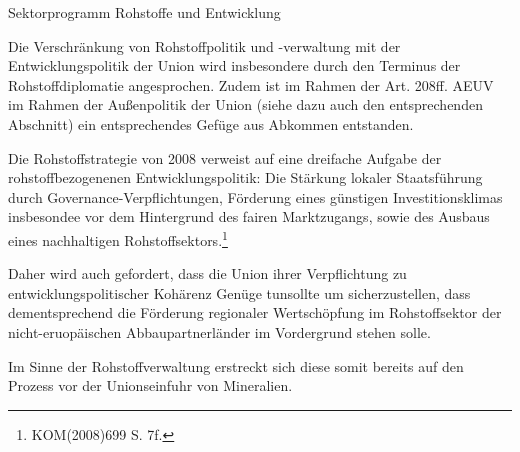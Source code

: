 \documentclass[12pt,a4paper,oneside]{book} %
\begin{document}
{	Sektorprogramm Rohstoffe und Entwicklung
	
	Die Verschränkung von Rohstoffpolitik und -verwaltung mit der Entwicklungspolitik der Union wird insbesondere durch den Terminus der Rohstoffdiplomatie angesprochen. Zudem ist im Rahmen der Art. 208ff. AEUV im Rahmen der Außenpolitik der Union (siehe dazu auch den entsprechenden Abschnitt) ein entsprechendes Gefüge aus Abkommen entstanden.
	
	Die Rohstoffstrategie von 2008 verweist auf eine dreifache Aufgabe der rohstoffbezogenenen Entwicklungspolitik: Die Stärkung lokaler Staatsführung durch Governance-Verpflichtungen, Förderung eines günstigen Investitionsklimas insbesondee vor dem Hintergrund des fairen Marktzugangs, sowie des Ausbaus eines nachhaltigen Rohstoffsektors.\footnote{KOM(2008)699 S. 7f.}
	
	Daher wird auch gefordert, dass die Union \glqq ihrer Verpflichtung zu entwicklungspolitischer Kohärenz Genüge tun\grqq sollte um sicherzustellen, dass dementsprechend die Förderung regionaler Wertschöpfung im Rohstoffsektor der nicht-eruopäischen Abbaupartnerländer im Vordergrund stehen solle.\autocite[15]{Kueblboeck_2023}
	
	Im Sinne der Rohstoffverwaltung erstreckt sich diese somit bereits auf den Prozess vor der Unionseinfuhr von Mineralien.
	

	
	
}
\end{document}
